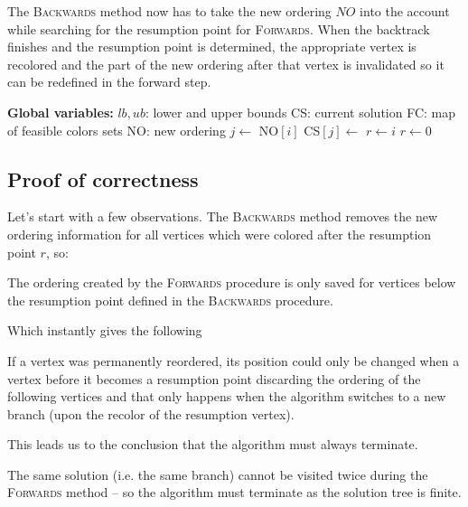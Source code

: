 \vspace{10pt}
The \textsc{Backwards} method now has to take the new ordering $NO$ into the account while searching for the resumption point for \textsc{Forwards}. When the backtrack finishes and the resumption point is determined, the appropriate vertex is recolored and the part of the new ordering after that vertex is invalidated so it can be redefined in the forward step.
\vspace{10pt}

 \begin{algorithmic}[1]
  \Statex \textbf{Global variables:}
 \Statex $lb, ub$: lower and upper bounds
 \Statex CS: current solution
 \Statex FC: map of feasible colors sets
 \Statex NO: new ordering
            \ls $j \gets$ NO$[i]$
            \ls {}
                    \ls CS$[j] \gets $ 
                        \ls {} 
                    \mEndWhile
                    \ls $r \gets i$
                    \RETURN
                \mEndIf
            \mEndIf
        \mEndFor
        \ls $r \gets 0$
	\mEndProcedure
\end{algorithmic}

\subsection{Proof of correctness}
Let's start with a few observations. The \textsc{Backwards} method removes the new ordering information for all vertices which were colored after the resumption point $r$, so:
\begin{observation}
    The ordering created by the \textsc{Forwards} procedure is only saved for vertices below the resumption point defined in the \textsc{Backwards} procedure.
\end{observation}
Which instantly gives the following
\begin{observation}
    If a vertex was permanently reordered, its position could only be changed when a vertex before it becomes a resumption point discarding the ordering of the following vertices and that only happens when the algorithm switches to a new branch (upon the recolor of the resumption vertex).
\end{observation}
This leads us to the conclusion that the algorithm must always terminate.
\begin{corollaryobs}
    The same solution (i.e. the same branch) cannot be visited twice during the \textsc{Forwards} method -- so the algorithm must terminate as the solution tree is finite.
\end{corollaryobs}

